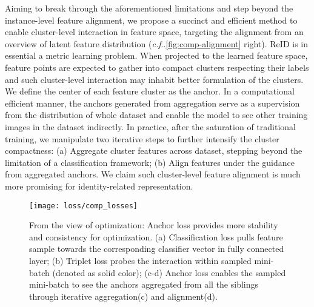 \documentclass[runningheads]{llncs}
\makeatletter
\DeclareRobustCommand\onedot{\futurelet\@let@token\@onedot}
\def\@onedot{\ifx\@let@token.\else.\null\fi\xspace}
\def\cf{\emph{c.f}\onedot} \def\Cf{\emph{C.f}\onedot}
\makeatother
\begin{document}
Aiming to break through the aforementioned limitations and step beyond the instance-level feature alignment, we propose a succinct and efficient method to enable cluster-level interaction in feature space, targeting the alignment from an overview of latent feature distribution (\cf \cref{fig:comp-alignment} right). ReID is in essential a metric learning problem. When projected to the learned feature space, feature points are expected to gather into compact clusters respecting their labels and such cluster-level interaction may inhabit better formulation of the clusters. We define the center of each feature cluster as the anchor. In a computational efficient manner, the anchors generated from aggregation serve as a supervision from the distribution of whole dataset and enable the model to see other training images in the dataset indirectly. In practice, after the saturation of traditional training, we manipulate two iterative steps to further intensify the cluster compactness: (a) Aggregate cluster features across dataset, stepping beyond the limitation of a classification framework; (b) Align features under the guidance from aggregated anchors. We claim such cluster-level feature alignment is much more promising for identity-related representation.

\begin{figure}
    \vspace*{-0.38cm}
    \centering
\texttt{[image: loss/comp\_losses]}
    \vspace*{-0.68cm}
    \caption{From the view of optimization: Anchor loss provides more stability and consistency for optimization. (a) Classification loss pulls feature sample  towards the corresponding classifier vector  in fully connected layer; (b) Triplet loss probes the interaction within sampled mini-batch (denoted as solid color); (c-d) Anchor loss enables the sampled mini-batch to see the anchors aggregated from all the siblings through iterative aggregation(c) and alignment(d).}
    \label{fig:view-optimization}
    \vspace*{-0.68cm}
\end{figure}
\end{document}
